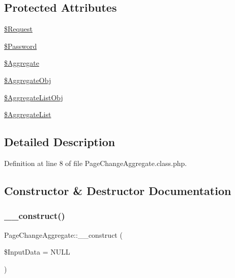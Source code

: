 \subsection*{Protected Attributes}
\begin{DoxyCompactItemize}
\item 
\hyperlink{class_page_change_aggregate_a9525db589381a20bc18181d3a737eff3}{\$\+Request}
\item 
\hyperlink{class_page_change_aggregate_a06951f45ee2542aa0a8dbd0c6fd553d2}{\$\+Password}
\item 
\hyperlink{class_page_change_aggregate_add95a19d95874295c5bcce3632fab156}{\$\+Aggregate}
\item 
\hyperlink{class_page_change_aggregate_a43e3bdc9ebf23a5c69f85d47a4ce9367}{\$\+Aggregate\+Obj}
\item 
\hyperlink{class_page_change_aggregate_ad97c00c3100301c9db47c30fb9170b2c}{\$\+Aggregate\+List\+Obj}
\item 
\hyperlink{class_page_change_aggregate_a722f2488a848b9b2bd14d8c1e028ea33}{\$\+Aggregate\+List}
\end{DoxyCompactItemize}


\subsection{Detailed Description}


Definition at line 8 of file Page\+Change\+Aggregate.\+class.\+php.



\subsection{Constructor \& Destructor Documentation}
\mbox{\label{class_page_change_aggregate_a37b7538f25666dae026a11df00733b32}} 
\subsubsection{\texorpdfstring{\+\_\+\+\_\+construct()}{\_\_construct()}}
{\footnotesize\ttfamily Page\+Change\+Aggregate\+::\+\_\+\+\_\+construct (\begin{DoxyParamCaption}\item[{}]{\$\+Input\+Data = {\ttfamily NULL} }\end{DoxyParamCaption})}

